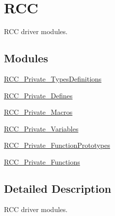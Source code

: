 \hypertarget{group___r_c_c}{\section{R\-C\-C}
\label{group___r_c_c}
}


R\-C\-C driver modules.  


\subsection*{Modules}
\begin{DoxyCompactItemize}
\item 
\hyperlink{group___r_c_c___private___types_definitions}{R\-C\-C\-\_\-\-Private\-\_\-\-Types\-Definitions}
\item 
\hyperlink{group___r_c_c___private___defines}{R\-C\-C\-\_\-\-Private\-\_\-\-Defines}
\item 
\hyperlink{group___r_c_c___private___macros}{R\-C\-C\-\_\-\-Private\-\_\-\-Macros}
\item 
\hyperlink{group___r_c_c___private___variables}{R\-C\-C\-\_\-\-Private\-\_\-\-Variables}
\item 
\hyperlink{group___r_c_c___private___function_prototypes}{R\-C\-C\-\_\-\-Private\-\_\-\-Function\-Prototypes}
\item 
\hyperlink{group___r_c_c___private___functions}{R\-C\-C\-\_\-\-Private\-\_\-\-Functions}
\end{DoxyCompactItemize}


\subsection{Detailed Description}
R\-C\-C driver modules. 
